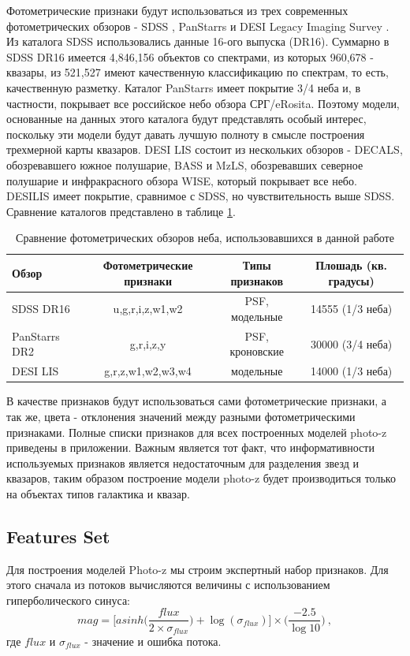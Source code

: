 \documentclass[fleqn,usenatbib]{mnras}
\begin{document}
Фотометрические признаки будут использоваться из трех современных фотометрических обзоров - SDSS \cite{bib:sdss}, PanStarrs \cite{bib:panstarrs} и DESI Legacy Imaging Survey \cite{bib:desi}. Из каталога SDSS использовались данные 16-ого выпуска (DR16). Суммарно в SDSS DR16 имеется 4,846,156 объектов со спектрами, из которых 960,678 - квазары, из 521,527 имеют качественную классификацию по спектрам, то есть, качественную разметку. Каталог PanStarrs имеет покрытие 3/4 неба и, в частности, покрывает все российское небо обзора СРГ/eRosita. Поэтому модели, основанные на данных этого каталога будут представлять особый интерес, поскольку эти модели будут давать лучшую полноту в смысле построения трехмерной карты квазаров. DESI LIS состоит из нескольких обзоров - DECALS, обозревавшего южное полушарие, BASS и MzLS, обозревавших северное полушарие и инфракрасного обзора WISE, который покрывает все небо. DESILIS имеет покрытие, сравнимое с SDSS, но чувствительность выше SDSS. Сравнение каталогов представлено в таблице \ref{tab:catalogs_comparison}.

\begin{table}[ht]
    \caption{Сравнение фотометрических обзоров неба, использовавшихся в данной работе}
    \label{tab:catalogs_comparison}
    \centering
    \begin{tabular}{|l|c|c|c|}
    \hline
        Обзор & Фотометрические признаки & Типы признаков & Плошадь (кв. градусы) \\
    \hline
        SDSS DR16 & u,g,r,i,z,w1,w2 & PSF, модельные & 14555 (1/3 неба) \\
        PanStarrs DR2 & g,r,i,z,y & PSF, кроновские & 30000 (3/4 неба) \\
        DESI LIS & g,r,z,w1,w2,w3,w4 & модельные & 14000 (1/3 неба) \\[1ex]
        \hline
    \end{tabular}
\end{table}

В качестве признаков будут использоваться сами фотометрические признаки, а так же, цвета - отклонения значений между разными фотометрическими признаками. Полные списки признаков для всех построенных моделей photo-z приведены в приложении. Важным является тот факт, что информативности используемых признаков является недостаточным для разделения звезд и квазаров, таким образом построение модели photo-z будет производиться только на объектах типов галактика и квазар.

\subsection{Features Set}
Для построения моделей Photo-z мы строим экспертный набор признаков. Для этого сначала из потоков вычисляются величины с использованием гиперболического синуса:
\begin{equation}\label{eq:asinhmag}
    mag = \Bigg[asinh\Bigg(\frac{flux}{2 \times \sigma_{flux}}\Bigg) + \log(\sigma_{flux})\Bigg] \times \Bigg(\frac{-2.5}{\log 10}\Bigg) ~,
\end{equation}
где $flux$ и $\sigma_{flux}$ - значение и ошибка потока.
\end{document}
